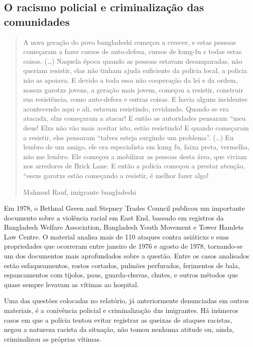 \subsection{O racismo policial e criminalização das comunidades}

\begin{quote}
A nova geração do povo bangladeshi começou a crescer, e estas pessoas começaram a fazer cursos de auto-defesa, cursos de kung-fu e todas estas coisas. (…) Naquela época quando as pessoas estavam desamparadas, não queriam resistir, elas não tinham ajuda suficiente da policia local, a policia não as apoiava. E devido a toda essa não cooperação da lei e da ordem, nossxs garotxs jovens, a geração mais jovem, começou a resistir, construir sua resistência, como auto-defesa e outras coisas. E havia alguns incidentes acontecendo aqui e ali, estavam resistindo, revidando. Quando se era atacadx, elxs começaram a atacar! E então as autoridades pensaram “meu deus! Elxs não vão mais aceitar isto, estão resistindo! E quando começaram a resistir, eles pensaram “talvez esteja surgindo um problema”. (…) Eu lembro de um amigo, ele era especialista em kung fu, faixa preta, vermelha, não me lembro. Ele começou a mobilizar as pessoas desta área, que viviam nos arredores de Brick Lane. E então a policia começou a prestar atenção, “essxs garotxs estão começando a resistir, é melhor fazer algo!

Mahmud Rauf, imigrante bangladeshi
\end{quote}

Em 1978, o Bethnal Green and Stepney Trades Council publicou um importante documento sobre a violência racial em East End, baseado em registros da Bangladesh Welfare Association, Bangladesh Youth Movement e Tower Hamlets Law Centre. O material analisa mais de 110 ataques contra asiáticxs e suas propriedades que ocorreram entre janeiro de 1976 e agosto de 1978, tornando-se um dos documentos mais aprofundados sobre a questão. Entre os casos analisados estão esfaqueamentos, rostos cortados, pulmões perfurados, ferimentos de bala, espancamentos com tijolos, paus, guarda-chuvas, chutes, e outros métodos que quase sempre levavam as vítimas ao hospital.

Uma das questões colocadas no relatório, já anteriormente denunciadas em outros materiais, é a conivência policial e criminalização dxs imigrantes. Há inúmeros casos em que a polícia tentou evitar registrar as queixas de ataques racistas, negou a natureza racista da situação, não tomou nenhuma atitude ou, ainda, criminalizou as próprias vítimas.

